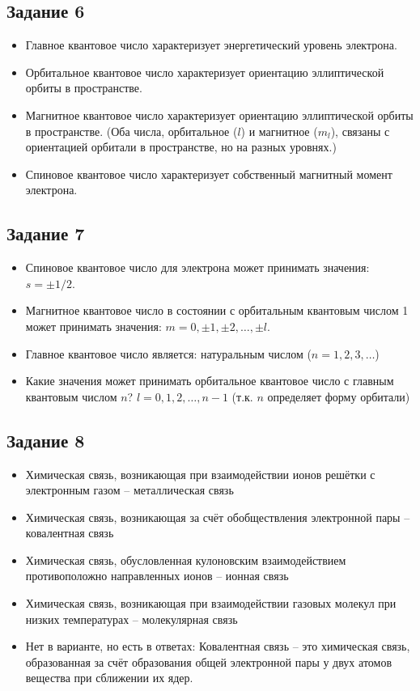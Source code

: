 \documentclass[../main.tex]{subfiles}
\begin{document}
\subsection{Задание 6}
\begin{itemize}
    \item Главное квантовое число характеризует энергетический уровень электрона.
    \item Орбитальное квантовое число характеризует ориентацию эллиптической орбиты в пространстве.
    \item Магнитное квантовое число характеризует ориентацию эллиптической орбиты в пространстве. (Оба числа, орбитальное ($l$) и магнитное ($m_l$), связаны с ориентацией орбитали в пространстве, но на разных уровнях.)
    \item Спиновое квантовое число характеризует собственный магнитный момент электрона.
\end{itemize}

\subsection{Задание 7}
\begin{itemize}
    \item Спиновое квантовое число для электрона может принимать значения: $s = \pm 1/2$.
    \item Магнитное квантовое число в состоянии с орбитальным квантовым числом 1 может принимать значения: $m = 0, \pm1, \pm2, \dots, \pm l$.
    \item Главное квантовое число является: натуральным числом ($n = 1, 2, 3, \dots$)
    \item Какие значения может принимать орбитальное квантовое число с главным квантовым числом $n$? $l = 0, 1, 2, \dots, n-1$ (т.к. $n$ определяет форму орбитали)
\end{itemize}

\subsection{Задание 8}
\begin{itemize}
    \item Химическая связь, возникающая при взаимодействии ионов решётки с электронным газом – металлическая связь
    \item Химическая связь, возникающая за счёт обобществления электронной пары – ковалентная связь
    \item Химическая связь, обусловленная кулоновским взаимодействием противоположно направленных ионов – ионная связь
    \item Химическая связь, возникающая при взаимодействии газовых молекул при низких температурах – молекулярная связь
    \item Нет в варианте, но есть в ответах: Ковалентная связь – это химическая связь, образованная за счёт образования общей электронной пары у двух атомов вещества при сближении их ядер.
\end{itemize}
\end{document}
